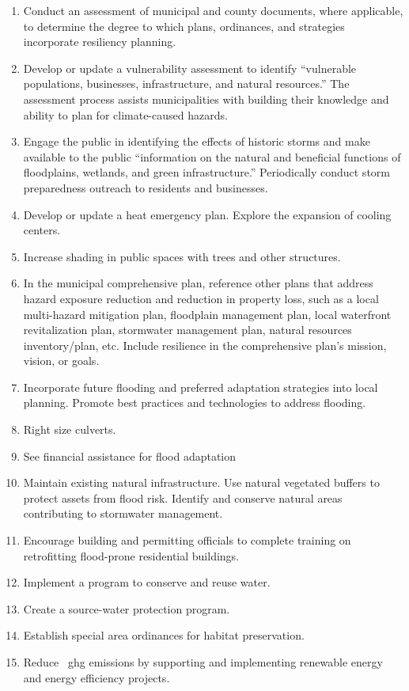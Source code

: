\begin{enumerate}
    \item Conduct an assessment of municipal and county documents, where 
applicable, to determine the degree to which plans, ordinances, and strategies 
incorporate resiliency planning.
    \item Develop or update a vulnerability assessment to identify ``vulnerable 
    populations, businesses, infrastructure, and natural resources.'' The 
    assessment process assists municipalities with building their knowledge and 
    ability to plan for climate-caused hazards.
    \item Engage the public in identifying the effects of historic storms 
    and make available to the public ``information on the natural and 
    beneficial 
    functions of floodplains, wetlands, and green infrastructure.'' 
    Periodically conduct storm preparedness outreach to residents and 
    businesses.
    \item Develop or update a heat emergency plan. Explore the expansion of 
    cooling centers.
    \item Increase shading in public spaces with trees and other structures.
    \item In the municipal comprehensive plan, reference other plans that 
    address hazard exposure reduction and reduction in property loss, such as a 
    local multi-hazard mitigation plan, floodplain management plan, local 
    waterfront revitalization plan, stormwater management plan, natural 
    resources inventory/plan, etc. Include resilience in the comprehensive 
    plan's mission, vision, or goals.
    \item Incorporate future flooding and preferred adaptation strategies into 
    local planning. Promote best practices and technologies to address flooding.
    \item Right size culverts.
    \item See financial assistance for flood adaptation
    \item Maintain existing natural infrastructure. Use natural vegetated 
    buffers to protect assets from flood risk. Identify and conserve natural 
    areas contributing to stormwater management. 
    \item Encourage building and permitting officials to complete training on 
    retrofitting flood-prone residential buildings.
    \item Implement a program to conserve and reuse water.
    \item Create a source-water protection program.
    \item Establish special area ordinances for habitat preservation. 
    \item Reduce ~\gls{ghg} emissions by supporting and implementing renewable 
    energy and energy efficiency projects.
\end{enumerate}
\nocite{climateexplorer}
\nocite{climatesmart}
\nocite{climateimpactshealth}
\nocite{nysag2014}
\nocite{mhredcstrategic}
\nocite{cscresiliency2014}
\nocite{ocnysenvironmental}
\nocite{degaetano2011}
